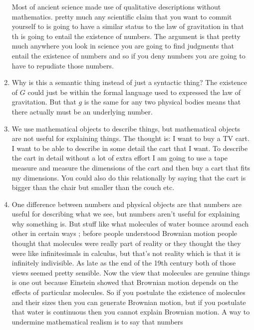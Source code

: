\documentclass[12pt]{article}
\theoremstyle{definition}
\begin{document}
\begin{enumerate}
        Most of ancient science made use of qualitative descriptions without
        mathematics. pretty much any scientific claim that you want to commit
        yourself to is going to have a similar status to the law of gravitation
        in that th is going to entail the existence of numbers. The argument is
        that pretty much anywhere you look in science you are going to find
        judgments that entail the existence of numbers and so if you deny
        numbers you are going to have to repudiate those numbers. 
    \item
        Why is this a semantic thing instead of just a syntactic thing? The
        existence of $G$ could just be within the formal language used to
        expressed the law of gravitation. But that $g$ is the same for any two
        physical bodies means that there actually must be an underlying number.
    \item
        We use mathematical objects to describe things, but mathematical
        objects are not useful for explaining things. The thought is: I want to
        buy a TV cart. I want to be able to describe in some detail the cart
        that I want. To describe the cart in detail without a lot of extra
        effort I am going to use a tape measure and measure the dimensions of
        the cart and then buy a cart that fits my dimensions. You could also do
        this relationally by saying that the cart is bigger than the chair but
        smaller than the couch etc. 
    \item
        One difference between numbers and physical objects are that numbers
        are useful for describing what we see, but numbers aren't useful for
        explaining why something is. But stuff like what molecules of water
        bounce around each other in certain ways ; before people understood
        Brownian motion people thought that molecules were really part of
        reality or they thought the they were like infinitesimals in calculus,
        but that's not reality which is that it is infinitely indivisible. As
        late as the end of the 19th century both of those views seemed pretty
        sensible. Now the view that molecules are genuine things is one out
        because Einstein showed that Brownian motion depends on the effects of
        particular molecules. So if you postulate the existence of molecules
        and their sizes then you can generate Brownian motion, but if you
        postulate that water is continuous then you cannot explain Brownian
        motion. A way to undermine mathematical realism is to say that numbers

\end{enumerate}
\end{document}
